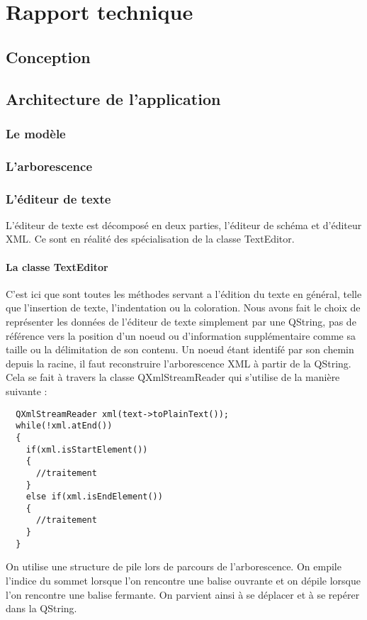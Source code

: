 \chapter{Rapport technique}

\section{Conception}


\section{Architecture de l'application}
\subsection{Le modèle}
\subsection{L'arborescence}

\subsection{L'éditeur de texte}
L'éditeur de texte est décomposé en deux parties, l'éditeur de schéma et d'éditeur XML. Ce sont en réalité des spécialisation de la classe TextEditor.
\subsubsection{La classe TextEditor}
C'est ici que sont toutes les méthodes servant a l'édition du texte en général, telle que l'insertion de texte, l'indentation ou la coloration.
Nous avons fait le choix de représenter les données de l'éditeur de texte simplement par une QString, pas de référence vers la position d'un noeud ou d'information supplémentaire comme sa taille ou la délimitation de son contenu.
Un noeud étant identifé par son chemin depuis la racine, il faut reconstruire l'arborescence XML à partir de la QString. Cela se fait à travers la classe QXmlStreamReader qui s'utilise de la manière suivante :
\lstset{language=C++, inputencoding=utf8}
\begin{lstlisting}
  QXmlStreamReader xml(text->toPlainText());
  while(!xml.atEnd())
  {
    if(xml.isStartElement())
    {
      //traitement
    }
    else if(xml.isEndElement())
    {
      //traitement
    }
  }
\end{lstlisting}
On utilise une structure de pile lors de parcours de l'arborescence. On empile l'indice du sommet lorsque l'on rencontre une balise ouvrante et on dépile lorsque l'on rencontre une balise fermante.
On parvient ainsi à se déplacer et à se repérer dans la QString.

